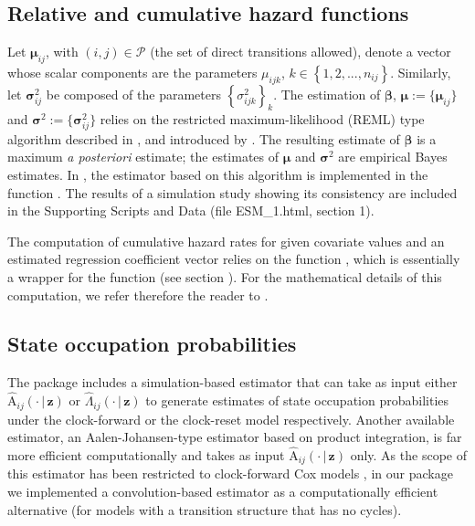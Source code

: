\subsection{Relative and cumulative hazard functions}
Let $\boldsymbol{\mu}_{\scriptscriptstyle ij}$, with $\left(i,j\right) \in \mathcal{P}$ (the set of direct transitions allowed), denote a vector whose scalar components are the parameters $\mu_{\scriptscriptstyle ijk}$,  $k \in \left\lbrace 1,2,...,n_{\scriptscriptstyle ij} \right\rbrace$.  Similarly, let $\boldsymbol{\sigma}^{2}_{\scriptscriptstyle ij}$ be composed of the parameters  $\left\lbrace \sigma^{2}_{\scriptscriptstyle ijk}\right\rbrace_{k}$. The estimation of  $\boldsymbol{\beta}$, $\boldsymbol{\mu}:=\lbrace\boldsymbol{\mu}_{\scriptscriptstyle{ij}}\rbrace$  and  $\boldsymbol{\sigma}^2:=\lbrace\boldsymbol{\sigma}^2_{\scriptscriptstyle ij }\rbrace$ relies on the restricted maximum-likelihood (REML) type algorithm described in \cite{Perperoglou2014}, and introduced by \cite{Schall1991}. The resulting estimate of $\boldsymbol{\beta}$ is a maximum \textit{a posteriori} estimate; the estimates of $\boldsymbol{\mu}$ and $\boldsymbol{\sigma}^{2}$ are empirical Bayes estimates. In , the estimator based on this algorithm  is implemented in the function  .  The results of a simulation study showing its consistency are included in the Supporting Scripts and Data (file ESM\_1.html, section 1). 


The computation of cumulative hazard rates for given covariate values  and an estimated regression coefficient vector relies on the function , which is essentially a wrapper for the function  (see section ). For the mathematical details of this computation, we refer therefore the reader to \citet{Wreede2010}.



\subsection{State occupation probabilities}
\label{sec:trans_probs}
The package  includes a simulation-based estimator that can take as input either  $\hat{\mathrm{A}}_{ij}\left(\cdot\,|\,\mathbf{z}\right)$ or $\hat{\Lambda}_{ij}\left(\cdot\,|\,\mathbf{z}\right)$ to generate estimates of state occupation probabilities under the clock-forward or the clock-reset model respectively.  
Another available estimator,  an Aalen-Johansen-type estimator based on product integration, is far more efficient computationally and takes as input $\hat{\mathrm{A}}_{ij}\left(\cdot\,|\,\mathbf{z}\right)$ only.  As the scope of this estimator has been restricted to clock-forward Cox models \citep{Andersen1993,Aalen2008}, in our package we implemented a convolution-based estimator as a computationally efficient alternative (for models with a transition structure that has no cycles).  

